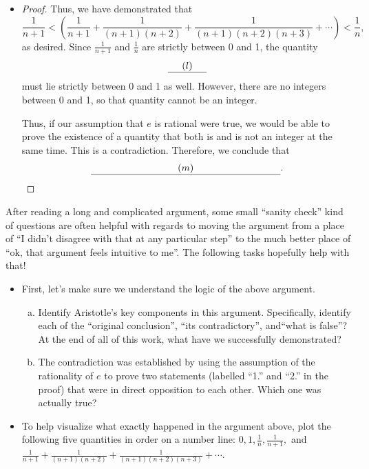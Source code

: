 \documentclass[11pt]{article}
\newcounter{tasknumb}
\newcommand{\tasknumb}[1]{\refstepcounter{tasknumb}\textmd{\textbf{$\fbox{$\fbox{Task \thetasknumb}$}$}}#1}
\newenvironment{task}[1][]%
 {\begin{itemize}
 \item[\tasknumb{#1}]  }
{
    \end{itemize}    }%
\begin{document}
\begin{task}
\begin{proof}
Thus, we have demonstrated that $$ \frac{1}{n+1} <  \left( \frac{1}{n+1}+ \frac{1}{(n+1)(n+2)}+\frac{1}{(n+1)(n+2)(n+3)}+\cdots\right) < \frac{1}{n}, $$ as desired.  Since $\frac{1}{n+1}$ and $\frac{1}{n}$ are strictly between 0 and 1, the quantity $$\underline{\hspace*{.2in}(l)\hspace*{.2in}}$$ must lie strictly between 0 and 1 as well.  However, there are no integers between 0 and 1, so that quantity cannot be an integer.  

Thus, if our assumption that $e$ is rational were true, we would be able to prove the existence of a quantity that both is and is not an integer at the same time.  This is a contradiction.  Therefore, we conclude that $$\underline{\hspace*{1.25in}(m)\hspace*{1.25in}}.$$
\end{proof}
\end{task}

After reading a long and complicated argument, some small ``sanity check'' kind of questions are often helpful with regards to moving the argument from a place of ``I didn't disagree with that at any particular step'' to the much better place of ``ok, that argument feels intuitive to me''.  The following tasks hopefully help with that!

\begin{task}
First, let's make sure we understand the logic of the above argument. 
\begin{enumerate}[(a)]
\item Identify Aristotle's key components in this argument.  Specifically, identify each of the ``{\sf original conclusion}'', ``{\sf its contradictory}'',
    and``{\sf what is false}''?  At the end of all of this work, what have we successfully demonstrated?
    \item The contradiction was established by using the assumption of the rationality of $e$ to prove two statements (labelled ``1.'' and ``2.'' in the proof) that were in direct opposition to each other.  Which one was actually true? 
    \end{enumerate}
\end{task}

\begin{task} To help visualize what exactly happened in the argument above, plot the following five quantities in order on a number line: $0,1, \frac{1}{n}, \frac{1}{n+1}, $ and $\frac{1}{n+1}+ \frac{1}{(n+1)(n+2)}+\frac{1}{(n+1)(n+2)(n+3)}+\cdots$. 

\end{task}
\end{document}
